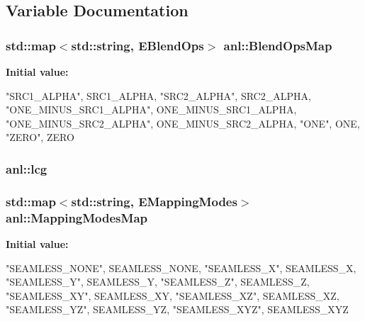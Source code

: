 \subsection{Variable Documentation}
\hypertarget{namespaceanl_a47cf9613caed8221805a2216a6a90e56}{
\subsubsection[{BlendOpsMap}]{\setlength{\rightskip}{0pt plus 5cm}std::map$<$std::string, {\bf EBlendOps}$>$ {\bf anl::BlendOpsMap}}}
\label{namespaceanl_a47cf9613caed8221805a2216a6a90e56}
{\bfseries Initial value:}
\begin{DoxyCode}
 {
        {"SRC1_ALPHA", SRC1_ALPHA},
        {"SRC2_ALPHA", SRC2_ALPHA},
        {"ONE_MINUS_SRC1_ALPHA", ONE_MINUS_SRC1_ALPHA},
        {"ONE_MINUS_SRC2_ALPHA", ONE_MINUS_SRC2_ALPHA},
        {"ONE", ONE},
        {"ZERO", ZERO}
    }
\end{DoxyCode}
\hypertarget{namespaceanl_a58089fb2d6abef1dba564f4c9ccbf88d}{
\subsubsection[{lcg}]{ {\bf anl::lcg}}}
\label{namespaceanl_a58089fb2d6abef1dba564f4c9ccbf88d}
\hypertarget{namespaceanl_a9dd48203bb1abdf23c826a3caa413ae3}{
\subsubsection[{MappingModesMap}]{\setlength{\rightskip}{0pt plus 5cm}std::map$<$std::string, {\bf EMappingModes}$>$ {\bf anl::MappingModesMap}}}
\label{namespaceanl_a9dd48203bb1abdf23c826a3caa413ae3}
{\bfseries Initial value:}
\begin{DoxyCode}
 {
        {"SEAMLESS_NONE", SEAMLESS_NONE},
        {"SEAMLESS_X", SEAMLESS_X},
        {"SEAMLESS_Y", SEAMLESS_Y},
        {"SEAMLESS_Z", SEAMLESS_Z},
        {"SEAMLESS_XY", SEAMLESS_XY},
        {"SEAMLESS_XZ", SEAMLESS_XZ},
        {"SEAMLESS_YZ", SEAMLESS_YZ},
        {"SEAMLESS_XYZ", SEAMLESS_XYZ}
    }
\end{DoxyCode}
